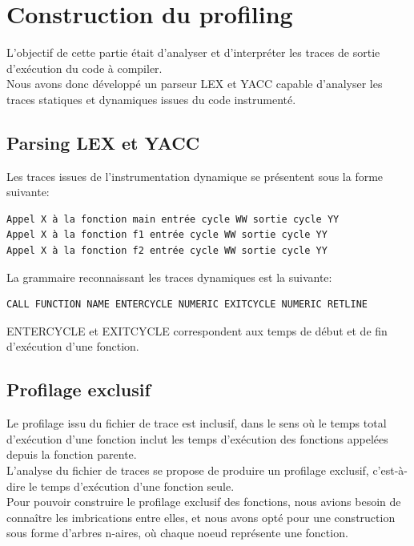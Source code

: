 \section{Construction du profiling}

L'objectif de cette partie était d'analyser et d'interpréter les traces de sortie d'exécution du code à compiler.\\

Nous avons donc développé un parseur LEX et YACC capable d'analyser les traces statiques et dynamiques issues du code instrumenté.

\subsection{Parsing LEX et YACC}

Les traces issues de l'instrumentation dynamique se présentent sous la forme suivante:
\begin{verbatim}
Appel X à la fonction main entrée cycle WW sortie cycle YY
Appel X à la fonction f1 entrée cycle WW sortie cycle YY
Appel X à la fonction f2 entrée cycle WW sortie cycle YY
\end{verbatim}

La grammaire reconnaissant les traces dynamiques est la suivante:
\begin{verbatim}
CALL FUNCTION NAME ENTERCYCLE NUMERIC EXITCYCLE NUMERIC RETLINE
\end{verbatim}

ENTERCYCLE et EXITCYCLE correspondent aux temps de début et de fin d'exécution d'une fonction.

\subsection{Profilage exclusif}

Le profilage issu du fichier de trace est inclusif, dans le sens où le temps total d'exécution d'une fonction inclut les temps d'exécution des fonctions appelées depuis la fonction parente.\\

L'analyse du fichier de traces se propose de produire un profilage exclusif, c'est-à-dire le temps d'exécution d'une fonction seule.\\

Pour pouvoir construire le profilage exclusif des fonctions, nous avions besoin de connaître les imbrications entre elles, et nous avons opté pour une construction sous forme d'arbres n-aires, où chaque noeud représente une fonction.\\

